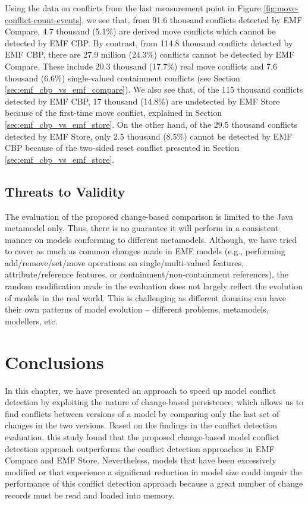 Using the data on conflicts from the last measurement point in Figure \ref{fig:move-conflict-count-events}, we see that, from 91.6 thousand conflicts detected by EMF Compare, 4.7 thousand (5.1\%) are derived move conflicts which cannot be detected by EMF CBP. By contrast, from 114.8 thousand conflicts detected by EMF CBP, there are 27.9 million (24.3\%) conflicts cannot be detected by EMF Compare. These include 20.3 thousand (17.7\%) real move conflicts and 7.6 thousand (6.6\%) single-valued containment conflicts (see Section \ref{sec:emf_cbp_vs_emf_compare}). We also see that, of the 115 thousand conflicts detected by EMF CBP, 17 thousand (14.8\%) are undetected by EMF Store because of the first-time move conflict, explained in Section \ref{sec:emf_cbp_vs_emf_store}. On the other hand, of the 29.5 thousand conflicts detected by EMF Store, only 2.5 thousand (8.5\%) cannot be detected by EMF CBP because of the two-sided reset conflict presented in Section \ref{sec:emf_cbp_vs_emf_store}.

\subsection{Threats to Validity}
\label{sec:threats_to_validity_8}
The evaluation of the proposed change-based comparison is limited to the Java metamodel only. Thus, there is no guarantee it will perform in a consistent manner on models conforming to different metamodels. Although, we have tried to cover as much as common changes made in EMF models (e.g., performing \textsf{add}/\textsf{remove}/\textsf{set}/\textsf{move} operations on \textsf{single}/\textsf{multi}-\textsf{valued} features, \textsf{attribute}/\textsf{reference} features, or \textsf{containment}/\textsf{non}-\textsf{containment} references), the random modification made in the evaluation does not largely reflect the evolution of models in the real world. This is challenging as different domains can have their own patterns of model evolution -- different problems, metamodels, modellers, etc.

\section{Conclusions}
\label{sec:conclusions_7}
In this chapter, we have presented an approach to speed up model conflict detection by exploiting the nature of change-based persistence, which allows us to find conflicts between versions of a model by comparing only the last set of changes in the two versions. Based on the findings in the conflict detection evaluation, this study found that the proposed change-based model conflict detection approach outperforms the conflict detection approaches in EMF Compare and EMF Store. Nevertheless, models that have been excessively modified or that experience a significant reduction in model size could impair the performance of this conflict detection approach because a great number of change records must be read and loaded into memory.

